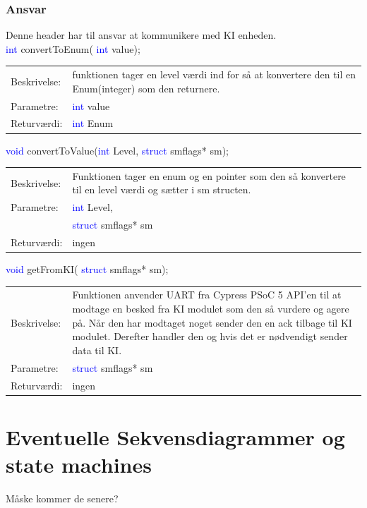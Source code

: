 \subsubsection{Ansvar}
Denne header har til ansvar at kommunikere med KI enheden.\\
\textcolor{blue}{int} convertToEnum( \textcolor{blue}{int} value); 
\begin{table}[H]
\begin{tabular}{l p{12.5cm}}
\hline
Beskrivelse:& funktionen tager en level værdi ind for så at konvertere den til en Enum(integer) som den returnere.\\
Parametre:&\textcolor{blue}{int} value\\
Returværdi:&\textcolor{blue}{int} Enum\\
\end{tabular}
\end{table}
\textcolor{blue}{void} convertToValue(\textcolor{blue}{int} Level,   \textcolor{blue}{struct} smflags* sm); 
\begin{table}[H]
\begin{tabular}{l p{12.5cm}}
\hline
Beskrivelse:& Funktionen tager en enum og en pointer som den så konvertere til en level værdi og sætter i sm structen.\\
Parametre:&\textcolor{blue}{int} Level,\\
 &\textcolor{blue}{struct} smflags* sm\\
Returværdi:&ingen\\
\end{tabular}
\end{table}
\textcolor{blue}{void} getFromKI( \textcolor{blue}{struct} smflags* sm); 
\begin{table}[H]
\begin{tabular}{l p{12.5cm}}
\hline
Beskrivelse:& Funktionen anvender UART fra Cypress PSoC 5 API'en til at modtage en besked fra KI modulet som den så vurdere og agere på. Når den har modtaget noget sender den en ack tilbage til KI modulet. Derefter handler den og hvis det er nødvendigt sender data til KI. \\
Parametre:&\textcolor{blue}{struct} smflags* sm\\
Returværdi:&ingen\\
\end{tabular}
\end{table}
\section{Eventuelle Sekvensdiagrammer og state machines}
Måske kommer de senere?